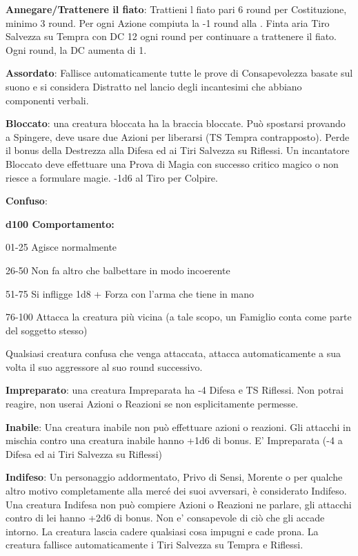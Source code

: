 \documentclass[a4paper,12 pt,openany]{book}
\begin{document}
\begin{textblock*}{19 cm}
\begin{multicols}{2}
\textbf{Annegare/Trattenere il fiato}:  Trattieni l fiato pari 6 round per Costituzione, minimo 3 round. Per ogni Azione compiuta la -1 round alla  . Finta aria Tiro Salvezza su Tempra con DC 12 ogni round per continuare a trattenere il fiato. Ogni round, la DC aumenta di 1.

\textbf{Assordato}: Fallisce automaticamente tutte le prove di Consapevolezza basate sul suono e si considera Distratto nel lancio degli incantesimi che abbiano componenti verbali.

\textbf{Bloccato}: una creatura bloccata ha la braccia bloccate. Può spostarsi provando a Spingere, deve usare due Azioni per liberarsi (TS Tempra contrapposto). Perde il bonus della Destrezza alla Difesa ed ai Tiri Salvezza su Riflessi. Un incantatore Bloccato deve effettuare una Prova di Magia con successo critico magico o non riesce a formulare magie. -1d6 al Tiro per Colpire.

\textbf{Confuso}: 

\textbf{d100 Comportamento:}

01-25 Agisce normalmente

26-50 Non fa altro che balbettare in modo incoerente

51-75 Si infligge 1d8 + Forza con l'arma che tiene in mano

76-100 Attacca la creatura più vicina (a tale scopo, un Famiglio conta come parte del soggetto stesso)

Qualsiasi creatura confusa che venga attaccata, attacca automaticamente a sua volta il suo aggressore al suo round successivo.

\textbf{Impreparato}: una creatura Impreparata ha -4 Difesa e TS Riflessi. Non potrai reagire, non userai Azioni o Reazioni se non esplicitamente permesse.

\textbf{Inabile}: Una creatura inabile non può effettuare azioni o reazioni. Gli attacchi in mischia contro una creatura inabile hanno +1d6 di bonus. E' Impreparata (-4 a Difesa ed ai Tiri Salvezza su Riflessi)

\textbf{Indifeso}: Un personaggio addormentato, Privo di Sensi, Morente o per qualche altro motivo completamente alla mercé dei suoi avversari, è considerato Indifeso. Una creatura Indifesa non può compiere Azioni o Reazioni ne parlare, gli attacchi contro di lei hanno +2d6 di bonus. Non e' consapevole di ciò che gli accade intorno. La creatura lascia cadere qualsiasi cosa impugni e cade prona. La creatura fallisce automaticamente i Tiri Salvezza su Tempra e Riflessi.


\end{multicols}
\end{textblock*}
\end{document}
